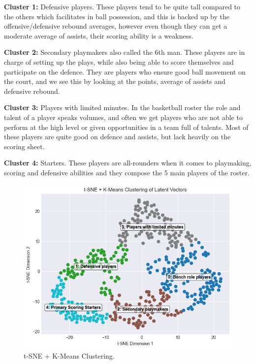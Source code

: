 \documentclass{article}
\begin{document}
{\bf Cluster 1:} Defensive players. These players tend to be quite tall compared to the others which facilitates in ball possession, and this is backed up by the offensive/defensive rebound averages, however even though they can get a moderate average of assists, their scoring ability is a weakness.

{\bf Cluster 2:} Secondary playmakers also called the 6th man. These players are in charge of setting up the plays, while also being able to score themselves and participate on the defence. They are players who ensure good ball movement on the court, and we see this by looking at the points, average of assists and defensive rebound. 

{\bf Cluster 3:} Players with limited minutes. In the basketball roster the role and talent of a player speaks volumes, and often we get players who are not able to perform at the high level or given opportunities in a team full of talents. Most of these players are quite good on defence and assists, but lack heavily on the scoring sheet.

{\bf Cluster 4:} Starters. These players are all-rounders when it comes to playmaking, scoring and defensive abilities and they compose the 5 main players of the roster.

\begin{figure}[h]
    \centering
    \includegraphics[width=0.7\linewidth]{media/2c.png}
    \caption{t-SNE + K-Means Clustering.}
\end{figure}
\end{document}
